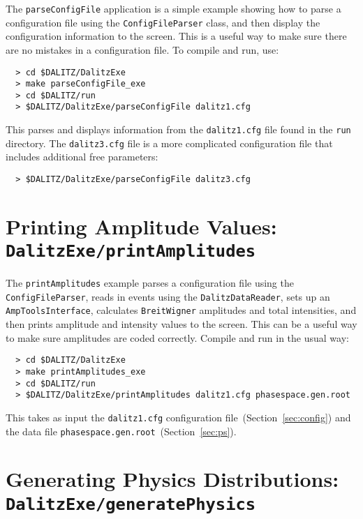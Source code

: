 \documentclass[11pt]{article}
\begin{document}
The {\tt parseConfigFile} application is a simple example showing how to parse a configuration file using the {\tt ConfigFileParser} class, and then display the configuration information to the screen.  This is a useful way to make sure there are no mistakes in a configuration file.  To compile and run, use:
\begin{verbatim}
  > cd $DALITZ/DalitzExe
  > make parseConfigFile_exe
  > cd $DALITZ/run
  > $DALITZ/DalitzExe/parseConfigFile dalitz1.cfg
\end{verbatim}
This parses and displays information from the {\tt dalitz1.cfg} file found in the {\tt run} directory.  The {\tt dalitz3.cfg} file is a more complicated configuration file that includes additional free parameters:
\begin{verbatim}
  > $DALITZ/DalitzExe/parseConfigFile dalitz3.cfg
\end{verbatim}

\section{Printing Amplitude Values: \\
{\tt DalitzExe/printAmplitudes}}

The {\tt printAmplitudes} example parses a configuration file using the {\tt ConfigFileParser}, reads in events using the {\tt DalitzDataReader}, sets up an {\tt AmpToolsInterface}, calculates {\tt BreitWigner} amplitudes and total intensities, and then prints amplitude and intensity values to the screen. This can be a useful way to make sure amplitudes are coded correctly.  Compile and run in the usual way:
\begin{verbatim}
  > cd $DALITZ/DalitzExe
  > make printAmplitudes_exe
  > cd $DALITZ/run
  > $DALITZ/DalitzExe/printAmplitudes dalitz1.cfg phasespace.gen.root
\end{verbatim}
This takes as input the {\tt dalitz1.cfg} configuration file~(Section~\ref{sec:config}) and the data file {\tt phasespace.gen.root}~(Section~\ref{sec:ps}).

\section{Generating Physics Distributions: \\ 
{\tt DalitzExe/generatePhysics}}
\label{sec:physics}
\end{document}
